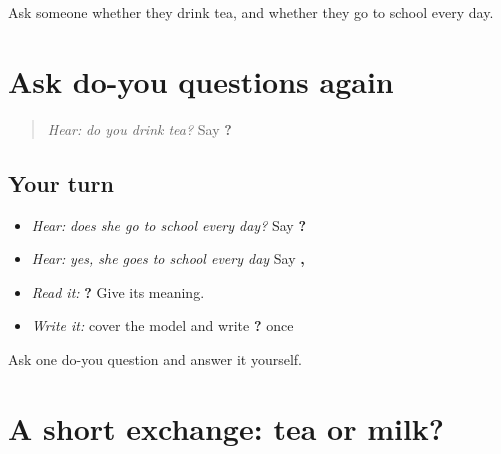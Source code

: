 \begin{tcolorbox}[breakable,colback=teal!4,colframe=teal!35!black,title={Before you move on}]
Ask someone whether they drink tea, and whether they go to school every day.
\end{tcolorbox}
\section[\texorpdfstring{\pa{ਕੀ} \pa{ਤੁਸੀਂ} \pa{ਚਾਹ} \pa{ਪੀਂਦੇ} \pa{ਹੋ}? (kī tusīṁ chāh …)}{ਕੀ ਤੁਸੀਂ ਚਾਹ ਪੀਂਦੇ ਹੋ? (kī tusīṁ chāh …)}]{Ask do-you questions again}

\label{lesson:PA-C215-ki-review}



\begin{quote}
\emph{Hear:} \emph{do you drink tea?} Say \textbf{    ?}
\end{quote}

\subsection*{Your turn}
\begin{itemize}
\raggedright
  \item \emph{Hear:} \emph{does she go to school every day?} Say \textbf{     ?}
  \item \emph{Hear:} \emph{yes, she goes to school every day} Say \textbf{ ,     }
  \item \emph{Read it:} \textbf{    ?} Give its meaning.
  \item \emph{Write it:} cover the model and write \textbf{    ?} once
\end{itemize}

\begin{tcolorbox}[breakable,colback=teal!4,colframe=teal!35!black,title={Before you move on}]
Ask one do-you question and answer it yourself.
\end{tcolorbox}
\section[\texorpdfstring{\pa{ਨਹੀਂ} \pa{ਜੀ}, \pa{ਮੈਂ} \pa{ਚਾਹ} … (nahīṁ jī, maiṁ …)}{ਨਹੀਂ ਜੀ, ਮੈਂ ਚਾਹ … (nahīṁ jī, maiṁ …)}]{A short exchange: tea or milk?}

\label{lesson:PA-C215-exchange}



